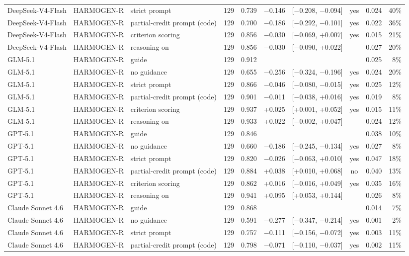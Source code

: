 \documentclass[10pt]{article}
\begin{document}
\begin{longtable}{ll>{\raggedright\arraybackslash}p{2.9cm}rrrlclr}
DeepSeek-V4-Flash & HARMOGEN-R & strict prompt & 129 & 0.739 & $-$0.146 & [$-$0.208, $-$0.094] & yes & 0.024 & 40\% \\
DeepSeek-V4-Flash & HARMOGEN-R & partial-credit prompt (code) & 129 & 0.700 & $-$0.186 & [$-$0.292, $-$0.101] & yes & 0.022 & 36\% \\
DeepSeek-V4-Flash & HARMOGEN-R & criterion scoring & 129 & 0.856 & $-$0.030 & [$-$0.069, +0.007] & yes & 0.015 & 21\% \\
DeepSeek-V4-Flash & HARMOGEN-R & reasoning on & 129 & 0.856 & $-$0.030 & [$-$0.090, +0.022] &  & 0.027 & 20\% \\
GLM-5.1 & HARMOGEN-R & guide & 129 & 0.912 &  &  &  & 0.025 & 8\% \\
GLM-5.1 & HARMOGEN-R & no guidance & 129 & 0.655 & $-$0.256 & [$-$0.324, $-$0.196] & yes & 0.024 & 20\% \\
GLM-5.1 & HARMOGEN-R & strict prompt & 129 & 0.866 & $-$0.046 & [$-$0.080, $-$0.015] & yes & 0.025 & 12\% \\
GLM-5.1 & HARMOGEN-R & partial-credit prompt (code) & 129 & 0.901 & $-$0.011 & [$-$0.038, +0.016] & yes & 0.019 & 8\% \\
GLM-5.1 & HARMOGEN-R & criterion scoring & 129 & 0.937 & +0.025 & [+0.001, +0.052] & yes & 0.015 & 11\% \\
GLM-5.1 & HARMOGEN-R & reasoning on & 129 & 0.933 & +0.022 & [$-$0.002, +0.047] &  & 0.024 & 12\% \\
GPT-5.1 & HARMOGEN-R & guide & 129 & 0.846 &  &  &  & 0.038 & 10\% \\
GPT-5.1 & HARMOGEN-R & no guidance & 129 & 0.660 & $-$0.186 & [$-$0.245, $-$0.134] & yes & 0.027 & 8\% \\
GPT-5.1 & HARMOGEN-R & strict prompt & 129 & 0.820 & $-$0.026 & [$-$0.063, +0.010] & yes & 0.047 & 18\% \\
GPT-5.1 & HARMOGEN-R & partial-credit prompt (code) & 129 & 0.884 & +0.038 & [+0.010, +0.068] & no & 0.040 & 13\% \\
GPT-5.1 & HARMOGEN-R & criterion scoring & 129 & 0.862 & +0.016 & [$-$0.016, +0.049] & yes & 0.035 & 16\% \\
GPT-5.1 & HARMOGEN-R & reasoning on & 129 & 0.941 & +0.095 & [+0.053, +0.144] &  & 0.026 & 8\% \\
Claude Sonnet 4.6 & HARMOGEN-R & guide & 129 & 0.868 &  &  &  & 0.014 & 7\% \\
Claude Sonnet 4.6 & HARMOGEN-R & no guidance & 129 & 0.591 & $-$0.277 & [$-$0.347, $-$0.214] & yes & 0.001 & 2\% \\
Claude Sonnet 4.6 & HARMOGEN-R & strict prompt & 129 & 0.757 & $-$0.111 & [$-$0.156, $-$0.072] & yes & 0.003 & 11\% \\
Claude Sonnet 4.6 & HARMOGEN-R & partial-credit prompt (code) & 129 & 0.798 & $-$0.071 & [$-$0.110, $-$0.037] & yes & 0.002 & 11\% \\
\hline
\end{longtable}
\endgroup
\end{document}
